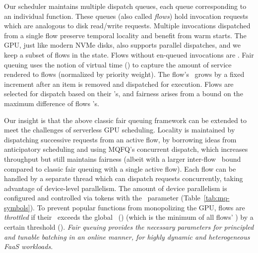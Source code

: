 Our scheduler maintains multiple dispatch queues, each queue corresponding to an individual function.
These queues (also called \emph{flows}) hold invocation requests which are analogous to disk read/write requests.
Multiple invocations dispatched from a single flow preserve temporal locality and benefit from warm starts.
The GPU, just like modern NVMe disks, also supports parallel dispatches, and we keep a subset of flows in the  state.
Flows without en-queued invocations are .
Fair queuing uses the notion of virtual time (\VT) to capture the amount of service rendered to flows (normalized by priority weight).
The flow's \VT~grows by a fixed increment after an item is removed and dispatched for execution.
Flows are selected for dispatch based on their \VT's, and fairness arises from a bound on the maximum difference of flows \VT's.

Our insight is that the above classic fair queuing framework can be extended to meet the challenges of serverless GPU scheduling.
Locality is maintained by dispatching successive requests from an active flow, by borrowing ideas from anticipatory scheduling and using MQFQ's concurrent dispatch, which increases throughput but still maintains fairness (albeit with a larger inter-flow \VT~bound compared to classic fair queuing with a single active flow).
Each flow can be handled by a separate thread which can dispatch requests concurrently, taking advantage of device-level parallelism.
The amount of device parallelism is configured and controlled via tokens with the \D~parameter (Table~\ref{tab:mq-symbols}). 
To prevent popular functions from monopolizing the GPU, flows are \emph{throttled} if their \VT~exceeds the global \VT~(\GlobVT) (which is the minimum of all flows' \VT) by a certain threshold (\T).
\emph{Fair queuing provides the necessary parameters for principled and tunable batching in an online manner, for highly dynamic and heterogeneous FaaS workloads.}

